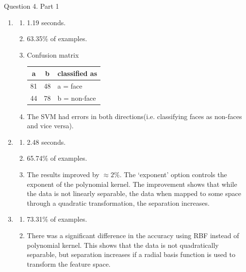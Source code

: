 \documentclass[11pt]{article}
\begin{document}
Question 4. Part 1
\begin{enumerate}
	\item
		\begin{enumerate} 
			\item 1.19 seconds.
			\item 63.35\% of examples.
			\item Confusion matrix
			\begin{tabular}{|c|c|l|}
			\hline
			  a  & b  &  classified as \\
			\hline
		 		81 & 48 &  a = face \\
		 		44 & 78 &  b = non-face \\
		 	\hline
		 	\end{tabular}
		 	\item The SVM had errors in both directions(i.e. classifying faces as non-faces and vice versa).
		\end{enumerate}
 	
 	\item
 		\begin{enumerate} 
			\item 2.48 seconds.
			\item 65.74\% of examples.
			\item The results improved by $\approx 2\%$. The `exponent' option controls the exponent of
			the polynomial kernel. The improvement shows that while the data is not linearly separable,
			the data when mapped to some space through a quadratic transformation, the separation
			increases.
		\end{enumerate}
	
	\item
 		\begin{enumerate} 
			\item 73.31\% of examples.
			\item There was a significant difference in the accuracy using RBF instead of polynomial
			kernel. This shows that the data is not quadratically separable, but separation
			increases if a radial basis function is used to transform the feature space.
		\end{enumerate}
\end{enumerate}
\end{document}
